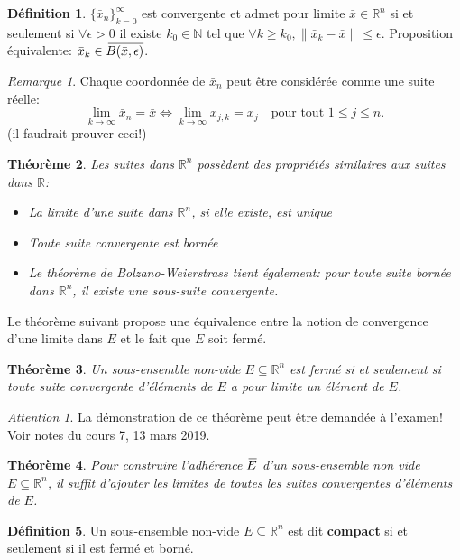 \documentclass{report}
\theoremstyle{plain}
\newtheorem{thm}{Théorème}[chapter]
\theoremstyle{definition}
\newtheorem{defn}[thm]{Définition}
\theoremstyle{remark}
\newtheorem*{remark}{Remarque}
\newtheorem*{attention}{Attention}
\newcommand*{\skol}[2][3]{{}\mkern#1mu\overline{\mkern-#1mu#2}} %
\newcommand*\adh[1]{\skol{#1}}
\newcommand*{\norm}[1]{\lVert#1\rVert}
\begin{document}
\begin{defn}
	$\{\bar x_n\}_{k=0}^\infty$ est convergente et admet pour limite $\bar x \in \mathbb R^n$ si et seulement si $\forall\epsilon > 0$ il existe $k_0 \in \mathbb N$ tel que $\forall k \geq k_0, \norm{\bar x_k - \bar x} \leq \epsilon$. Proposition équivalente: $\bar x_k \in \adh{B(\bar x, \epsilon)}$.
\end{defn}
\begin{remark}
	Chaque coordonnée de $\bar x_n$ peut être considérée comme une suite réelle:
	\begin{equation}
		\lim_{k \to \infty} \bar x_n = \bar x \iff \lim_{k \to \infty} x_{j, k} = x_j \quad \text{pour tout } 1 \leq j \leq n.
	\end{equation} (il faudrait prouver ceci!)
\end{remark}

\begin{thm}
	Les suites dans $\mathbb R^n$ possèdent des propriétés similaires aux suites dans $\mathbb R$:
	\begin{itemize}
		\item La limite d'une suite dans $\mathbb R^n$, si elle existe, est unique
		\item Toute suite convergente est bornée
		\item Le théorème de Bolzano-Weierstrass tient également: pour toute suite bornée dans $\mathbb R^n$, il existe une sous-suite convergente.
	\end{itemize}
\end{thm}

Le théorème suivant propose une équivalence entre la notion de convergence d'une limite dans $E$ et le fait que $E$ soit fermé.
\begin{thm}
	Un sous-ensemble non-vide $E \subseteq \mathbb R^n$ est fermé si et seulement si toute suite convergente d'éléments de $E$ a pour limite un élément de $E$.
\end{thm}
\begin{attention}
La démonstration de ce théorème peut être demandée à l'examen! Voir notes du cours 7, 13 mars 2019.
\end{attention}

\begin{thm}
	Pour construire l'adhérence $\adh E$ d'un sous-ensemble non vide $E \subseteq \mathbb R^n$, il suffit d'ajouter les limites de toutes les suites convergentes d'éléments de $E$.
\end{thm}

\begin{defn}
	Un sous-ensemble non-vide $E \subseteq \mathbb R^n$ est dit \textbf{compact} si et seulement si il est fermé et borné.
\end{defn}
\end{document}
